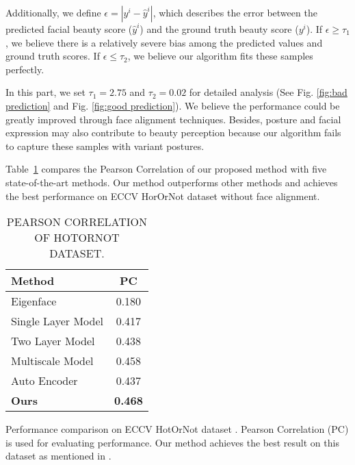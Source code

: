 \documentclass[a4paper,conference]{IEEEtran}
\begin{document}
    Additionally, we define $\epsilon=|y^i-\hat{y}^i|$, which describes the error
    between the predicted facial beauty score ($\hat{y}^i$) and the ground truth
    beauty score ($y^i$). If $\epsilon\geq\tau_1$, we believe there is a relatively
    severe bias among the predicted values and ground truth scores. If
    $\epsilon\leq\tau_2$, we believe our algorithm fits these samples perfectly.

    In this part, we set $\tau_1=2.75$ and $\tau_2=0.02$ for detailed analysis
    (See Fig. \ref{fig:bad prediction} and Fig. \ref{fig:good prediction}).
    We believe the performance could be greatly improved through face alignment
    techniques. Besides, posture and facial expression may also contribute to
    beauty perception because our algorithm fails to capture these samples with
    variant postures.

    Table~\ref{tb:PC} compares the Pearson Correlation of our proposed method
    with five state-of-the-art methods. Our method outperforms other methods and
    achieves the best performance on ECCV HorOrNot dataset without face alignment.

    \begin{table}[!htb]
      \caption{PEARSON CORRELATION OF HOTORNOT DATASET.}
      \label{eccv performance comparison}
      \begin{center}
        \begin{tabular}{l|c}
          \hline
          \textbf{Method} &  \textbf{PC} \\ \hline\hline
          Eigenface & 0.180 \\
          Single Layer Model & 0.417 \\
          Two Layer Model & 0.438 \\
          Multiscale Model \cite{gray2010predicting} & 0.458 \\
          Auto Encoder \cite{wang2014attractive} & 0.437 \\
          \textbf{{Ours}} & \textbf{{0.468}} \\ \hline
        \end{tabular}
        \begin{tablenotes}
          \footnotesize
          Performance comparison on ECCV HotOrNot dataset
          \cite{gray2010predicting}.
          Pearson Correlation (PC) is used for evaluating performance.
          Our method achieves the best result on this dataset as mentioned in
          \cite{gray2010predicting}.
        \end{tablenotes}
      \end{center}\label{tb:PC}
    \end{table}
\end{document}

